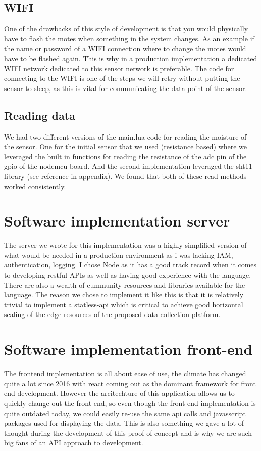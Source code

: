 \documentclass[]{uiophd}
\begin{document}
\subsection{WIFI}
One of the drawbacks of this style of development is that you would physically have to flash the motes when something in the system changes. As an example if the name or password of a WIFI connection where to change the motes would have to be flashed again. This is why in a production implementation a dedicated WIFI network dedicated to this sensor network is preferable. The code for connecting to the WIFI is one of the steps we will retry without putting the sensor to sleep, as this is vital for communicating the data point of the sensor.
\subsection{Reading data}
We had two different versions of the main.lua code for reading the moisture of the sensor. One for the initial sensor that we used (resistance based) where we leveraged the built in functions for reading the resistance of the adc pin of the gpio of the nodemcu board. And the second implementation leveraged the sht11 library (see reference in appendix). We found that both of these read methods worked consistently.
\section{Software implementation server}
The server we wrote for this implementation was a highly simplified version of what would be needed in a production environment as i was lacking IAM, authentication, logging. I chose Node as it has a good track record when it comes to developing restful APIs as well as having good experience with the language. There are also a wealth of cummunity resources and libraries available for the language. The reason we chose to implement it like this is that it is relatively trivial to implement a statless-api which is critical to achieve good horizontal scaling of the edge resources of the proposed data collection platform.
\section{Software implementation front-end}
The frontend implementation is all about ease of use, the climate has changed quite a lot since 2016 with react coming out as the dominant framework for front end development. However the arcitechture of this application allows us to quickly change out the front end, so even though the front end implementation is quite outdated today, we could easily re-use the same api calls and javasscript packages used for displaying the data. This is also something we gave a lot of thought during the development of this proof of concept and is why we are such big fans of an API approach to development. 
\end{document}
